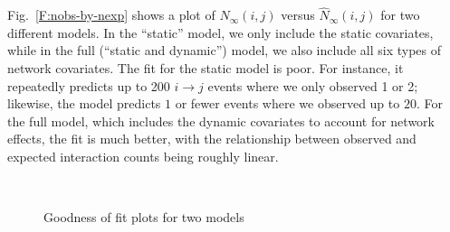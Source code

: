 \documentclass[final]{statsoc}
\begin{document}
Fig.~\ref{F:nobs-by-nexp} shows a plot of $N_\infty(i,j)$ versus $\hat
N_\infty(i,j)$ for two different models.  In the ``static'' model, we only
include the static covariates, while in the full (``static and dynamic'') model,
we also include all six types of network covariates.  The fit for the static model
is poor.  For instance, it repeatedly predicts up to 200 $i \to
j$ events where we only observed 1 or 2; likewise, the model predicts $1$ or
fewer events where we observed up to $20$.  For the full model, which includes
the dynamic covariates to account for network effects, the fit is much better, with the relationship between
observed and expected interaction counts being roughly linear.

\begin{figure}
  \centering
  \\
  \caption{\label{F:goodness}
    Goodness of fit plots for two models
  }
\end{figure}
\end{document}
